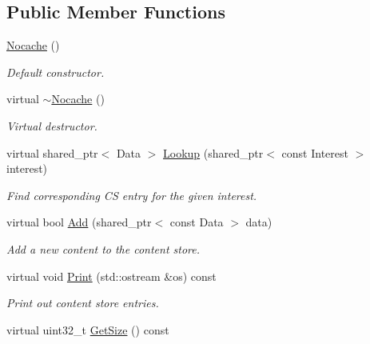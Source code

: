 \subsection*{Public Member Functions}
\begin{DoxyCompactItemize}
\item 
\hyperlink{classns3_1_1ndn_1_1cs_1_1Nocache_aa29885be8dcb7e8b30e9585d0f98d3ef}{Nocache} ()\hypertarget{classns3_1_1ndn_1_1cs_1_1Nocache_aa29885be8dcb7e8b30e9585d0f98d3ef}{}\label{classns3_1_1ndn_1_1cs_1_1Nocache_aa29885be8dcb7e8b30e9585d0f98d3ef}

\begin{DoxyCompactList}\small\item\em Default constructor. \end{DoxyCompactList}\item 
virtual \hyperlink{classns3_1_1ndn_1_1cs_1_1Nocache_a2d19d82499b4d0c845da38e5277d9ec3}{$\sim$\+Nocache} ()\hypertarget{classns3_1_1ndn_1_1cs_1_1Nocache_a2d19d82499b4d0c845da38e5277d9ec3}{}\label{classns3_1_1ndn_1_1cs_1_1Nocache_a2d19d82499b4d0c845da38e5277d9ec3}

\begin{DoxyCompactList}\small\item\em Virtual destructor. \end{DoxyCompactList}\item 
virtual shared\+\_\+ptr$<$ Data $>$ \hyperlink{classns3_1_1ndn_1_1cs_1_1Nocache_ac2e00baf27c718bd2b766c0e320c5b75}{Lookup} (shared\+\_\+ptr$<$ const Interest $>$ interest)
\begin{DoxyCompactList}\small\item\em Find corresponding CS entry for the given interest. \end{DoxyCompactList}\item 
virtual bool \hyperlink{classns3_1_1ndn_1_1cs_1_1Nocache_a45ae8dc7e30b96df3b565e69e318e0ab}{Add} (shared\+\_\+ptr$<$ const Data $>$ data)
\begin{DoxyCompactList}\small\item\em Add a new content to the content store. \end{DoxyCompactList}\item 
virtual void \hyperlink{classns3_1_1ndn_1_1cs_1_1Nocache_ab300654a62360bc05c3c65228bd76d1c}{Print} (std\+::ostream \&os) const\hypertarget{classns3_1_1ndn_1_1cs_1_1Nocache_ab300654a62360bc05c3c65228bd76d1c}{}\label{classns3_1_1ndn_1_1cs_1_1Nocache_ab300654a62360bc05c3c65228bd76d1c}

\begin{DoxyCompactList}\small\item\em Print out content store entries. \end{DoxyCompactList}\item 
virtual uint32\+\_\+t \hyperlink{classns3_1_1ndn_1_1cs_1_1Nocache_a60e7d12b76a43236a737887b9180c8c5}{Get\+Size} () const\hypertarget{classns3_1_1ndn_1_1cs_1_1Nocache_a60e7d12b76a43236a737887b9180c8c5}{}\label{classns3_1_1ndn_1_1cs_1_1Nocache_a60e7d12b76a43236a737887b9180c8c5}


\end{DoxyCompactItemize}
